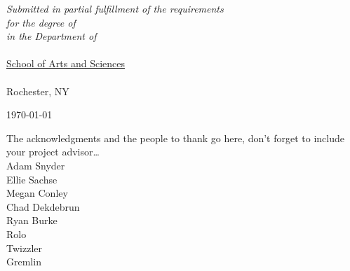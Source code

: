\documentclass[
11pt, %
english, %
doublespacing, %
nolistspacing, %
headsepline, %
]{MastersDoctoralThesis} %
\begin{document}
\begin{titlepage}
\begin{singlespace}
\begin{center}
\vfill

\large \textit{Submitted in partial fulfillment of the requirements\\ for the degree of \degreename}\\[0.3cm] %
\textit{in the Department of}\\[0.4cm]
\deptname\\{\href{https://www.sas.rochester.edu/}{School of Arts and Sciences}}\\\univname\\{Rochester, NY} %
 
\vfill

{\large \today}\\[4cm] %

 
\vfill
\end{center}
\end{singlespace}
\end{titlepage}






{
\hypersetup{hidelinks}
\tableofcontents %
}






\begin{acknowledgements}
	\addchaptertocentry{\acknowledgementname} %
	The acknowledgments and the people to thank go here, don't forget to include your project advisor\ldots \\
	Adam Snyder \\
	Ellie Sachse \\
	Megan Conley \\
	Chad Dekdebrun \\
	Ryan Burke \\
	Rolo \\
	Twizzler \\
	Gremlin \\
\end{acknowledgements}
\end{document}
